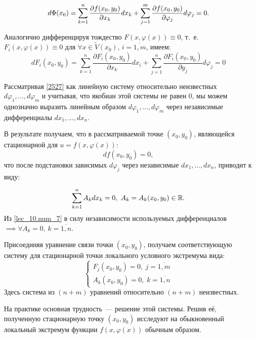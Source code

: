\documentclass[../../main.tex]{subfiles}
\begin{document}
\begin{equation} \label{lec_10.num_6}
	d\Phi(x_0) = \sum_{k = 1}^{n} \frac{\partial  f(x_0, y_0) }{\partial x_k} 
	dx_k + \sum_{j = 1}^{m} \frac{\partial  f(x_0, y_0) }{\partial \varphi_j} d\varphi_j = 0.
\end{equation}

Аналогично дифференцируя тождество $F(x, \varphi(x)) \equiv 0$, т.~е. $F_i(x, 
\varphi(x)) \equiv 0$ для ${\forall x \in \widetilde{V}(x_0)}$, $i = 
\overline{1, m}$, имеем:
\begin{equation}
\label{2527}
d F_i (x_0, y_0) = \sum\limits_{k=1}^{n} \dfrac{\partial F_i (x_0, 
y_0)}{\partial x_k} d x_i + \sum\limits_{j=1}^{n} \dfrac{\partial F_i (x_0, 
y_0)}{\partial y_j} d \varphi_j = 0
\end{equation}

Рассматривая \eqref{2527} как линейную систему относительно неизвестных
$d\varphi_1, \ldots, d\varphi_m$ и учитывая, что якобиан 
этой системы не равен $0$,
мы можем однозначно выразить линейным образом $d\varphi_1, \dots, d\varphi_m$
через независимые дифференциалы $dx_1, \ldots, dx_n$.

В результате получаем, что в рассматриваемой точке $(x_0, y_0)$,
являющейся стационарной для $u = f\left( x, \varphi(x) \right)$:
\[ df(x_0, y_0) = 0, \]
что после подстановки зависимых $d\varphi_j$ через независимые 
$dx_1, \ldots, dx_n$, приводит к виду:

\begin{equation} \label{lec_10.num_7}
	\sum_{k = 1}^{n} A_k dx_k = 0,\ A_k = A_k(x_0, y_0) \in \mathbb{R}.
\end{equation}
Из \eqref{lec_10.num_7} в силу независимости используемых дифференциалов 
$\implies \forall A_k = 0,\ k = \overline{1, n}$.

Присоединяя уравнение связи точки $(x_0, y_0)$, получаем 
соответствующую систему для стационарной точки локального 
условного экстремума вида:
\[ \begin{cases}
	F_j(x_0, y_0) = 0, \; j = \overline{1, m} \\
	A_k(x_0, y_0) = 0, \; k = \overline{1, n}
\end{cases} \]
Здесь система из $(n+m)$ уравнений относительно $(n+m)$ неизвестных.

На практике основная трудность~--- решение этой системы.
Решив её, полученную стационарную точку $(x_0, y_0)$ исследуют
на обыкновенный локальный экстремум функции $f(x, \varphi(x))$ обычным образом.
\end{document}
